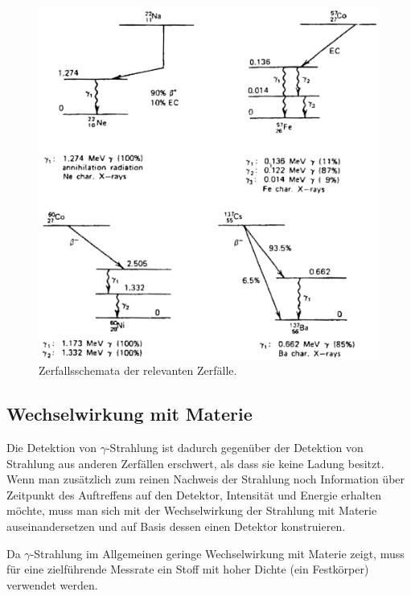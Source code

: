 \documentclass[
	a4paper,
	12pt,
	pagesize,
	ngerman
]{scrartcl}
\begin{document}
	\begin{figure}[H]
			\includegraphics[width= 0.8 \linewidth]{charts/Zerfallsschematarot}
			\caption{
				Zerfallsschemata der relevanten Zerfälle. %
				\cite{Anleitung}
			}
			\label{fig_zerfallsschemata}
	\end{figure}

	\subsection{Wechselwirkung mit Materie}

	Die Detektion von $\gamma$-Strahlung ist dadurch gegenüber der Detektion von Strahlung aus anderen Zerfällen erschwert, als dass sie keine Ladung besitzt.
	Wenn man zusätzlich zum reinen Nachweis der Strahlung noch Information über Zeitpunkt des Auftreffens auf den Detektor, Intensität und Energie erhalten möchte, muss man sich mit der Wechselwirkung der Strahlung mit Materie auseinandersetzen und auf Basis dessen einen Detektor konstruieren.

	Da $\gamma$-Strahlung im Allgemeinen geringe Wechselwirkung mit Materie zeigt, muss für eine zielführende Messrate ein Stoff mit hoher Dichte (ein Festkörper) verwendet werden.
\end{document}
